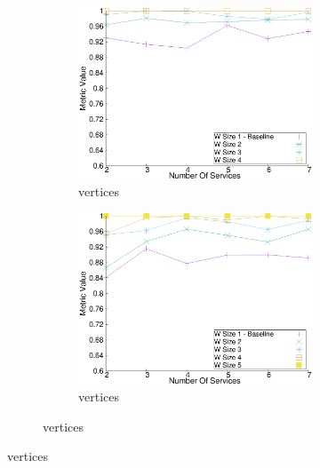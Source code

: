 \begin{figure}[H]
\begin{adjustbox}{minipage=\linewidth,scale=0.75}
\begin{subfigure}{0.45\textwidth}
          \begin{subfigure}{\textwidth}
            \includegraphics[width=\textwidth]{Images/graphs/window_quality_performance_diff_perce_n7_s7_50_89_n4}
            \caption{ vertices}

            \label{fig:quality_window_average_perce_n4}
          \end{subfigure}
          \begin{subfigure}{\textwidth}
            \includegraphics[width=\textwidth]{Images/graphs/window_quality_performance_diff_perce_n7_s7_50_89_n5}
            \caption{ vertices}
            \label{fig:quality_window_average_perce_n5}
          \end{subfigure}


\end{subfigure}
\end{adjustbox}
\end{figure}
